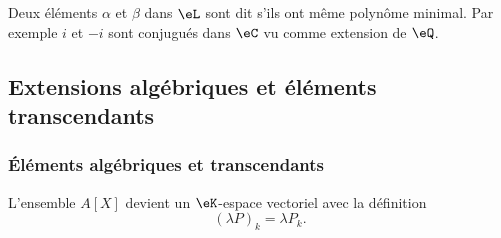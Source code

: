 \begin{definition}
	Deux éléments \( \alpha\) et \( \beta\) dans \( \eL\) sont dit  s'ils ont même polynôme minimal. Par exemple \( i\) et \( -i\) sont conjugués dans \( \eC\) vu comme extension de \( \eQ\).
\end{definition}

\subsection{Extensions algébriques et éléments transcendants}

\subsubsection{Éléments algébriques et transcendants}



\begin{definition}      \label{DEFooBBYGooWoOloR}
	L'ensemble \( A[X]\) devient un \( \eK\)-espace vectoriel avec la définition
	\begin{equation}
		(\lambda P)_k=\lambda P_k.
	\end{equation}
\end{definition}

